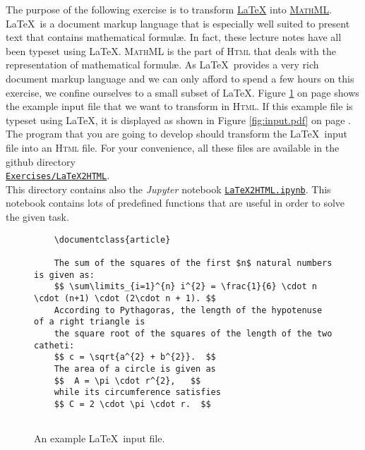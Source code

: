 \exerciseEng
The purpose of the following exercise is to transform \href{http://www.latex-project.org}{\LaTeX} into 
\href{https://www.tutorialspoint.com/mathml/index.htm}{\textsc{MathML}}.  \LaTeX\ is a document markup language
that is especially well suited to present text that contains mathematical formul\ae.  In fact, these
lecture notes have all been typeset using \LaTeX.  \textsc{MathML} is the part of \textsc{Html} that
deals with the representation of mathematical formul\ae.  As \LaTeX\ provides a very rich
document markup language and we can only afford to spend a few hours on this exercise, we confine
ourselves to a small subset of \LaTeX.  Figure \ref{fig:input.tex} on page \pageref{fig:input.tex}
shows the example input file that we want to transform in \textsc{Html}.  If this example file is
typeset using \LaTeX, it is displayed as shown in Figure \ref{fig:input.pdf} on page
\pageref{fig:input.pdf}.  The program that you are
going to develop should transform the \LaTeX\ input file into an \textsc{Html} file.  For your
convenience, all these files are available in the github directory 
\\[0.2cm]
\hspace*{1.3cm}
\href{https://github.com/karlstroetmann/Formal-Languages/tree/master/Exercises/LaTeX2HTML}{\texttt{Exercises/LaTeX2HTML}}.
\\[0.2cm]
This directory contains also the \textsl{Jupyter} notebook 
\href{https://github.com/karlstroetmann/Formal-Languages/tree/master/Exercises/LaTeX2HTML/LaTeX2HTML.ipynb}{\texttt{LaTeX2HTML.ipynb}}.
This notebook contains lots of predefined functions that are useful in order to solve the given task.

\begin{figure}[!ht]
  \centering
\begin{verbatim}
    \documentclass{article}
    
    The sum of the squares of the first $n$ natural numbers is given as:
    $$ \sum\limits_{i=1}^{n} i^{2} = \frac{1}{6} \cdot n \cdot (n+1) \cdot (2\cdot n + 1). $$
    According to Pythagoras, the length of the hypotenuse of a right triangle is
    the square root of the squares of the length of the two catheti:
    $$ c = \sqrt{a^{2} + b^{2}}.  $$
    The area of a circle is given as 
    $$  A = \pi \cdot r^{2},   $$ 
    while its circumference satisfies
    $$ C = 2 \cdot \pi \cdot r.  $$
    
    \end{verbatim}
  \caption{An example \LaTeX\ input file.}
  \label{fig:input.tex}
\end{figure}

